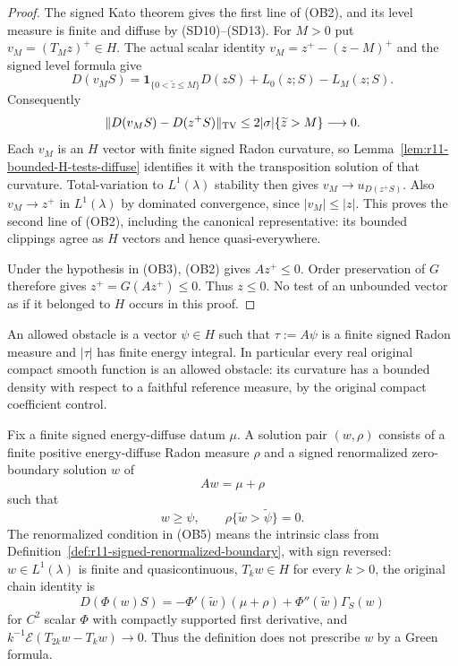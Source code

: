\begin{proof}
The signed Kato theorem gives the first line of (OB2), and its level
measure is finite and diffuse by (SD10)--(SD13).  For $M>0$ put
$v_M=(T_Mz)^+\in H$.  The actual scalar identity
$v_M=z^+-(z-M)^+$ and the signed level formula give
\[
 D(v_MS)=\mathbf1_{\{0<\widetilde z\le M\}}D(zS)
                                    +L_0(z;S)-L_M(z;S).
 \tag{OB4}
\]
Consequently
\[
 \|D(v_MS)-D(z^+S)\|_{\rm TV}
                   \le2|\sigma|\{\widetilde z>M\}\longrightarrow0.
\]
Each $v_M$ is an $H$ vector with finite signed Radon curvature, so
Lemma~\ref{lem:r11-bounded-H-tests-diffuse} identifies it with the
transposition solution of that curvature.  Total-variation to
$L^1(\lambda)$ stability then gives
$v_M\to u_{D(z^+S)}$.  Also $v_M\to z^+$ in $L^1(\lambda)$ by
dominated convergence, since $|v_M|\le|z|$.  This proves the second
line of (OB2), including the canonical representative: its bounded
clippings agree as $H$ vectors and hence quasi-everywhere.

Under the hypothesis in (OB3), (OB2) gives $Az^+\le0$.
Order preservation of $G$ therefore gives $z^+=G(Az^+)\le0$.
Thus $z\le0$.  No test of an unbounded vector as if it belonged
to $H$ occurs in this proof.
\end{proof}

\begin{definition}
\label{def:r11-diffuse-obstacle-class}
An allowed obstacle is a vector $\psi\in H$ such that
$\tau:=A\psi$ is a finite signed Radon measure and $|\tau|$ has
finite energy integral.  In particular every real original compact
smooth function is an allowed obstacle: its curvature has a bounded
density with respect to a faithful reference measure, by the
original compact coefficient control.

Fix a finite signed energy-diffuse datum $\mu$.  A solution pair
$(w,\rho)$ consists of a finite positive energy-diffuse Radon measure
$\rho$ and a signed renormalized zero-boundary solution $w$ of
\[
                               Aw=\mu+\rho
 \tag{OB5}
\]
such that
\[
                     w\ge\psi,\qquad
                     \rho\{\widetilde w>\widetilde\psi\}=0.
 \tag{OB6}
\]
The renormalized condition in (OB5) means the intrinsic class from
Definition~\ref{def:r11-signed-renormalized-boundary}, with sign
reversed: $w\in L^1(\lambda)$ is finite and quasicontinuous,
$T_kw\in H$ for every $k>0$, the original chain identity is
\[
 D(\Phi(w)S)=-\Phi'(\widetilde w)(\mu+\rho)
                         +\Phi''(\widetilde w)\Gamma_S(w)
 \tag{OB7}
\]
for $C^2$ scalar $\Phi$ with compactly supported first derivative,
and $k^{-1}\mathcal E(T_{2k}w-T_kw)\to0$.
Thus the definition does not prescribe $w$ by a Green formula.
\end{definition}

